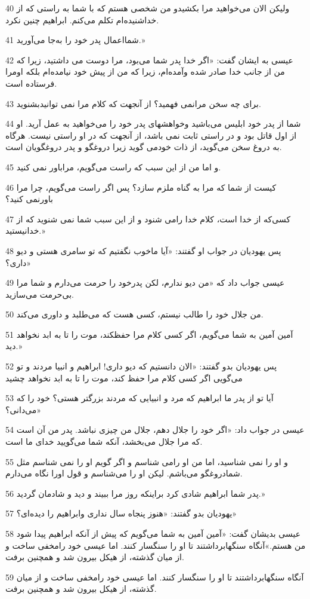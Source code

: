 \par 40 ولیکن الان می‌خواهید مرا بکشیدو من شخصی هستم که با شما به راستی که از خداشنیده‌ام تکلم می‌کنم. ابراهیم چنین نکرد.
\par 41 شمااعمال پدر خود را به‌جا می‌آورید.»
\par 42 عیسی به ایشان گفت: «اگر خدا پدر شما می‌بود، مرا دوست می داشتید، زیرا که من از جانب خدا صادر شده وآمده‌ام، زیرا که من از پیش خود نیامده‌ام بلکه اومرا فرستاده است.
\par 43 برای چه سخن مرانمی فهمید؟ از آنجهت که کلام مرا نمی توانیدبشنوید.
\par 44 شما از پدر خود ابلیس می‌باشید وخواهشهای پدر خود را می‌خواهید به عمل آرید. او از اول قاتل بود و در راستی ثابت نمی باشد، از آنجهت که در او راستی نیست. هرگاه به دروغ سخن می‌گوید، از ذات خودمی گوید زیرا دروغگو و پدر دروغگویان است.
\par 45 و اما من از این سبب که راست می‌گویم، مراباور نمی کنید.
\par 46 کیست از شما که مرا به گناه ملزم سازد؟ پس اگر راست می‌گویم، چرا مرا باورنمی کنید؟
\par 47 کسی‌که از خدا است، کلام خدا رامی شنود و از این سبب شما نمی شنوید که از خدانیستید.»
\par 48 پس یهودیان در جواب او گفتند: «آیا ماخوب نگفتیم که تو سامری هستی و دیو داری؟»
\par 49 عیسی جواب داد که «من دیو ندارم، لکن پدرخود را حرمت می‌دارم و شما مرا بی‌حرمت می‌سازید.
\par 50 من جلال خود را طالب نیستم، کسی هست که می‌طلبد و داوری می‌کند.
\par 51 آمین آمین به شما می‌گویم، اگر کسی کلام مرا حفظکند، موت را تا به ابد نخواهد دید.»
\par 52 پس یهودیان بدو گفتند: «الان دانستیم که دیو داری! ابراهیم و انبیا مردند و تو می‌گویی اگر کسی کلام مرا حفظ کند، موت را تا به ابد نخواهد چشید
\par 53 آیا تو از پدر ما ابراهیم که مرد و انبیایی که مردند بزرگتر هستی؟ خود را که می‌دانی؟»
\par 54 عیسی در جواب داد: «اگر خود را جلال دهم، جلال من چیزی نباشد. پدر من آن است که مرا جلال می‌بخشد، آنکه شما می‌گویید خدای ما است.
\par 55 و او را نمی شناسید، اما من او رامی شناسم و اگر گویم او را نمی شناسم مثل شمادروغگو می‌باشم. لیکن او را می‌شناسم و قول اورا نگاه می‌دارم.
\par 56 پدر شما ابراهیم شادی کرد براینکه روز مرا ببیند و دید و شادمان گردید.»
\par 57 یهودیان بدو گفتند: «هنوز پنجاه سال نداری وابراهیم را دیده‌ای؟»
\par 58 عیسی بدیشان گفت: «آمین آمین به شما می‌گویم که پیش از آنکه ابراهیم پیدا شود من هستم.»آنگاه سنگهابرداشتند تا او را سنگسار کنند. اما عیسی خود رامخفی ساخت و از میان گذشته، از هیکل بیرون شد و همچنین برفت.
\par 59 آنگاه سنگهابرداشتند تا او را سنگسار کنند. اما عیسی خود رامخفی ساخت و از میان گذشته، از هیکل بیرون شد و همچنین برفت.

